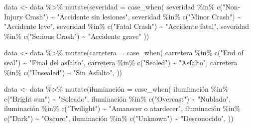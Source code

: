 \documentclass[
  letterpaper,
  DIV=11,
  numbers=noendperiod]{scrartcl}
\newenvironment{Shaded}{\begin{snugshade}}{\end{snugshade}}
\newcommand{\AttributeTok}[1]{\textcolor[rgb]{0.40,0.45,0.13}{#1}}
\newcommand{\FunctionTok}[1]{\textcolor[rgb]{0.28,0.35,0.67}{#1}}
\newcommand{\NormalTok}[1]{\textcolor[rgb]{0.00,0.23,0.31}{#1}}
\newcommand{\OtherTok}[1]{\textcolor[rgb]{0.00,0.23,0.31}{#1}}
\newcommand{\SpecialCharTok}[1]{\textcolor[rgb]{0.37,0.37,0.37}{#1}}
\newcommand{\StringTok}[1]{\textcolor[rgb]{0.13,0.47,0.30}{#1}}
\begin{document}
\begin{Shaded}
\begin{Highlighting}[]
\NormalTok{data }\OtherTok{\textless{}{-}}\NormalTok{ data }\SpecialCharTok{\%\textgreater{}\%}
  \FunctionTok{mutate}\NormalTok{(}\AttributeTok{severidad =} \FunctionTok{case\_when}\NormalTok{(}
\NormalTok{    severidad }\SpecialCharTok{\%in\%} \FunctionTok{c}\NormalTok{(}\StringTok{"Non{-}Injury Crash"}\NormalTok{) }\SpecialCharTok{\textasciitilde{}} \StringTok{"Accidente sin lesiones"}\NormalTok{,}
\NormalTok{        severidad }\SpecialCharTok{\%in\%} \FunctionTok{c}\NormalTok{(}\StringTok{"Minor Crash"}\NormalTok{) }\SpecialCharTok{\textasciitilde{}} \StringTok{"Accidente leve"}\NormalTok{,}
\NormalTok{    severidad }\SpecialCharTok{\%in\%} \FunctionTok{c}\NormalTok{(}\StringTok{"Fatal Crash"}\NormalTok{) }\SpecialCharTok{\textasciitilde{}} \StringTok{"Accidente fatal"}\NormalTok{,}
\NormalTok{    severidad }\SpecialCharTok{\%in\%} \FunctionTok{c}\NormalTok{(}\StringTok{"Serious Crash"}\NormalTok{) }\SpecialCharTok{\textasciitilde{}} \StringTok{"Accidente grave"}
\NormalTok{  ))}


\NormalTok{data }\OtherTok{\textless{}{-}}\NormalTok{ data }\SpecialCharTok{\%\textgreater{}\%}
  \FunctionTok{mutate}\NormalTok{(}\AttributeTok{carretera =} \FunctionTok{case\_when}\NormalTok{(}
\NormalTok{    carretera }\SpecialCharTok{\%in\%} \FunctionTok{c}\NormalTok{(}\StringTok{"End of seal"}\NormalTok{) }\SpecialCharTok{\textasciitilde{}} \StringTok{"Final del asfalto"}\NormalTok{,}
\NormalTok{    carretera }\SpecialCharTok{\%in\%} \FunctionTok{c}\NormalTok{(}\StringTok{"Sealed"}\NormalTok{) }\SpecialCharTok{\textasciitilde{}} \StringTok{"Asfalto"}\NormalTok{,}
\NormalTok{    carretera }\SpecialCharTok{\%in\%} \FunctionTok{c}\NormalTok{(}\StringTok{"Unsealed"}\NormalTok{) }\SpecialCharTok{\textasciitilde{}} \StringTok{"Sin Asfalto"}\NormalTok{,}
\NormalTok{  ))}


\NormalTok{data }\OtherTok{\textless{}{-}}\NormalTok{ data }\SpecialCharTok{\%\textgreater{}\%}
  \FunctionTok{mutate}\NormalTok{(iluminación }\OtherTok{=} \FunctionTok{case\_when}\NormalTok{(}
\NormalTok{    iluminación }\SpecialCharTok{\%in\%} \FunctionTok{c}\NormalTok{(}\StringTok{"Bright sun"}\NormalTok{) }\SpecialCharTok{\textasciitilde{}} \StringTok{"Soleado"}\NormalTok{,}
\NormalTok{    iluminación }\SpecialCharTok{\%in\%} \FunctionTok{c}\NormalTok{(}\StringTok{"Overcast"}\NormalTok{) }\SpecialCharTok{\textasciitilde{}} \StringTok{"Nublado"}\NormalTok{,}
\NormalTok{    iluminación }\SpecialCharTok{\%in\%} \FunctionTok{c}\NormalTok{(}\StringTok{"Twilight"}\NormalTok{) }\SpecialCharTok{\textasciitilde{}} \StringTok{"Amanecer o atardecer"}\NormalTok{,}
\NormalTok{    iluminación }\SpecialCharTok{\%in\%} \FunctionTok{c}\NormalTok{(}\StringTok{"Dark"}\NormalTok{) }\SpecialCharTok{\textasciitilde{}} \StringTok{"Oscuro"}\NormalTok{,}
\NormalTok{    iluminación }\SpecialCharTok{\%in\%} \FunctionTok{c}\NormalTok{(}\StringTok{"Unknown"}\NormalTok{) }\SpecialCharTok{\textasciitilde{}} \StringTok{"Desconocido"}\NormalTok{,}
\NormalTok{  ))}



\end{Highlighting}
\end{Shaded}
\end{document}
